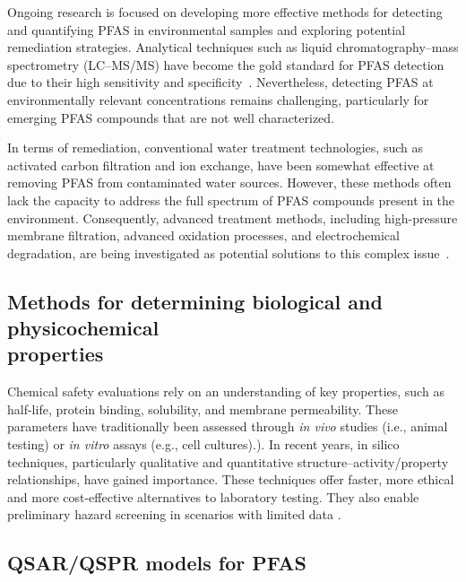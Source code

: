 Ongoing research is focused on developing more effective methods for detecting and quantifying PFAS in environmental samples and exploring potential remediation strategies. Analytical techniques such as liquid chromatography–mass spectrometry (LC–MS/MS) have become the gold standard for PFAS detection due to their high sensitivity and specificity~\cite{PFAS_detection_1, PFAS_detection_2, PFAS_detection_3, PFAS_detection_4}. Nevertheless, detecting PFAS at environmentally relevant concentrations remains challenging, particularly for emerging PFAS compounds that are not well characterized. 

In terms of remediation, conventional water treatment technologies, such as activated carbon filtration and ion exchange, have been somewhat effective at removing PFAS from contaminated water sources. However, these methods often lack the capacity to address the full spectrum of PFAS compounds present in the environment. Consequently, advanced treatment methods, including high-pressure membrane filtration, advanced oxidation processes, and electrochemical degradation, are being investigated as potential solutions to this complex issue~\cite{PFAS_membrane_filtration, PFAS_oxidation_1, PFAS_oxidation_2}.

\clearpage
\subsection{Methods for determining biological and physicochemical \\properties}

Chemical safety evaluations rely on an understanding of key properties, such as half-life, protein binding, solubility, and membrane permeability. These parameters have traditionally been assessed through \textit{in vivo} studies (i.e., animal testing) or \textit{in vitro} assays (e.g., cell cultures).). In recent years, in silico techniques, particularly qualitative and quantitative structure–activity/property relationships, have gained importance. These techniques offer faster, more ethical and more cost-effective alternatives to laboratory testing. They also enable preliminary hazard screening in scenarios with limited data \cite{Gkika2023, Cherkasov2014}.

\subsection{QSAR/QSPR models for PFAS}

